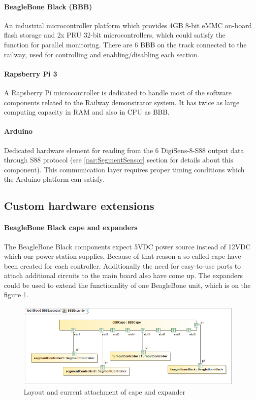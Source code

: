 \paragraph{BeagleBone Black (BBB)}
An industrial microcontroller platform which provides 4GB 8-bit eMMC on-board flash storage and 2x PRU 32-bit microcontrollers, which could satisfy the function for parallel monitoring. There are 6 BBB on the track connected to the railway, used for controlling and enabling/disabling each section.

\paragraph{Rapsberry Pi 3}
A Rapsberry Pi microcontroller is dedicated to handle most of the software components related to the Railway demonstrator system. It has twice as large computing capacity in RAM and also in CPU as BBB.

\paragraph{Arduino}
Dedicated hardware element for reading from the 6 DigiSens-8-S88 output data through S88 protocol (see \ref{par:SegmentSensor} section for details about this component). This communication layer requires proper timing conditions which the Arduino platform can satisfy.

\subsection{Custom hardware extensions}
\paragraph{BeagleBone Black cape and expanders}\label{par:BBBcape}
The BeagleBone Black components expect 5VDC power source instead of 12VDC which our power station supplies. Because of that reason a so called cape have been created for each controller. Additionally the need for easy-to-use ports to attach additional circuits to the main board also have come up. The expanders could be used to extend the functionality of one BeagleBone unit, which is on the figure \ref{fig:capeSysml}. 
\begin{figure}[!h]
	\centering
	\includegraphics[width=150mm]{figures/modes3/BBBExpander.png}
	\caption{Layout and current attachment of cape and expander}
	\label{fig:capeSysml}
\end{figure}

